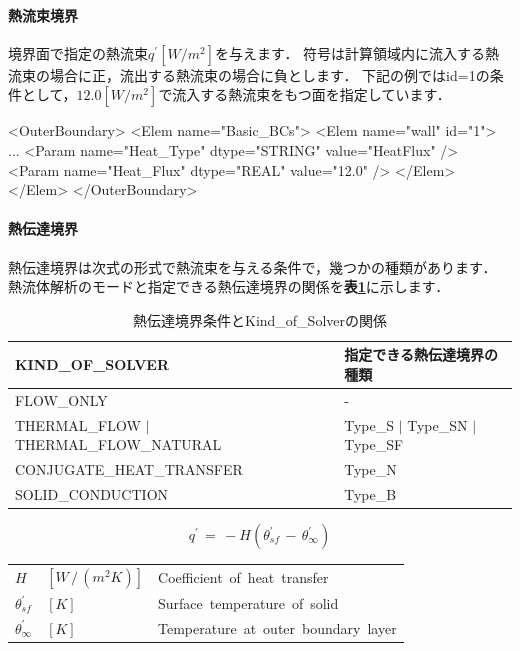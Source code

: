 %
\paragraph{熱流束境界}
境界面で指定の熱流束$q^{\prime}[W/m^2]$を与えます．
符号は計算領域内に流入する熱流束の場合に正，流出する熱流束の場合に負とします．
下記の例ではid=1の条件として，$12.0[W/m^2]$で流入する熱流束をもつ面を指定しています．

{\small
\begin{program}
<OuterBoundary>
  <Elem name="Basic_BCs">
    <Elem name="wall" id="1">
      ...
      <Param name="Heat_Type"       dtype="STRING" value="HeatFlux" />
      <Param name="Heat_Flux"       dtype="REAL"   value="12.0" />
    </Elem>
  </Elem>
</OuterBoundary>
\end{program}
}


%
\hypertarget{tgt:heat-transfer}{\paragraph{熱伝達境界}}
熱伝達境界は次式の形式で熱流束を与える条件で，幾つかの種類があります．
熱流体解析のモードと指定できる熱伝達境界の関係を\textbf{表\ref{tbl:type of HT}}に示します．

\begin{table}[htdp]
\caption{熱伝達境界条件とKind\_of\_Solverの関係}
\begin{center}
\small
\begin{tabular}{ll} \toprule
KIND\_OF\_SOLVER & 指定できる熱伝達境界の種類\\ \midrule
FLOW\_ONLY & -\\
THERMAL\_FLOW $|$ THERMAL\_FLOW\_NATURAL & Type\_S $|$ Type\_SN $|$ Type\_SF\\
CONJUGATE\_HEAT\_TRANSFER & Type\_N\\
SOLID\_CONDUCTION & Type\_B\\ \bottomrule
\end{tabular}
\end{center}
\label{tbl:type of HT}
\end{table}


\begin{equation}
q^{\prime} \,=\, -H(\theta_{sf}^{\prime}\,-\,\theta_{\infty}^{\prime})
\label{eq:ht form}
\end{equation}

\begin{center}
\begin{tabular}{lll}
$H$ &  $[W\,/\,(m^2K)]$ & Coefficient\, of\, heat\, transfer\\
$\theta_{sf}^{\prime}$ & $[K]$ & Surface\, temperature\, of\, solid\\
$\theta_{\infty}^{\prime}$ & $[K]$ & Temperature\, at\, outer\, boundary\, layer\\
\end{tabular}
\end{center}

